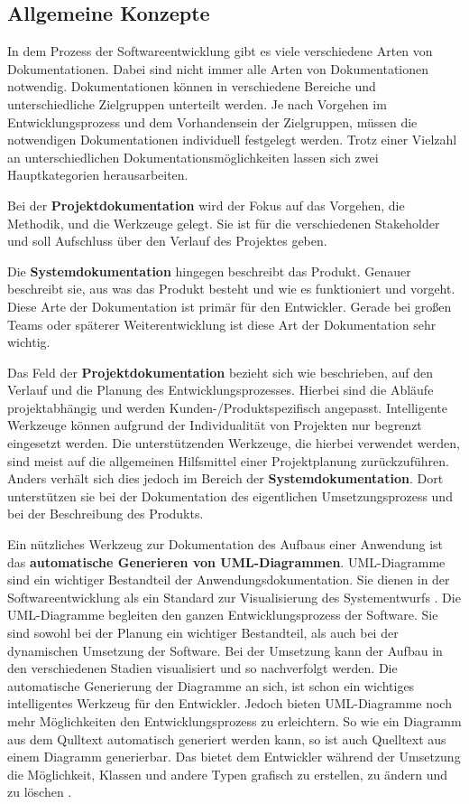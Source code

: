 \subsection{Allgemeine Konzepte}
\label{subsec:documentation_collaboration_concepts}
In dem Prozess der Softwareentwicklung gibt es viele verschiedene Arten von Dokumentationen. Dabei sind nicht immer alle Arten von Dokumentationen notwendig. Dokumentationen können in verschiedene Bereiche und unterschiedliche Zielgruppen unterteilt werden. Je nach Vorgehen im Entwicklungsprozess und dem Vorhandensein der Zielgruppen, müssen die notwendigen Dokumentationen individuell festgelegt werden. 
Trotz einer Vielzahl an unterschiedlichen Dokumentationsmöglichkeiten lassen sich zwei Hauptkategorien herausarbeiten. 

Bei der \textbf{Projektdokumentation} wird der Fokus auf das Vorgehen, die Methodik, und die Werkzeuge gelegt. Sie ist für die verschiedenen Stakeholder und soll Aufschluss über den Verlauf des Projektes geben. 

Die \textbf{Systemdokumentation} hingegen beschreibt das Produkt. Genauer beschreibt sie, aus was das Produkt besteht und wie es funktioniert und vorgeht. Diese Arte der Dokumentation ist primär für den Entwickler. Gerade bei großen Teams oder späterer Weiterentwicklung ist diese Art der Dokumentation sehr wichtig. 

Das Feld der \textbf{Projektdokumentation} bezieht sich wie beschrieben, auf den Verlauf und die Planung des Entwicklungsprozesses. Hierbei sind die Abläufe projektabhängig und werden Kunden-/Produktspezifisch angepasst. 
Intelligente Werkzeuge können aufgrund der Individualität von Projekten nur begrenzt eingesetzt werden. Die unterstützenden Werkzeuge, die hierbei verwendet werden, sind meist auf die allgemeinen Hilfsmittel einer Projektplanung zurückzuführen. 
Anders verhält sich dies jedoch im Bereich der \textbf{Systemdokumentation}. Dort unterstützen sie bei der Dokumentation des eigentlichen Umsetzungsprozess und bei der Beschreibung des Produkts.

Ein nützliches Werkzeug zur Dokumentation des Aufbaus einer Anwendung ist das \textbf{automatische Generieren von UML-Diagrammen}. UML-Diagramme sind ein wichtiger Bestandteil der Anwendungsdokumentation. Sie dienen in der Softwareentwicklung als ein Standard zur Visualisierung des Systementwurfs \cite{Ambler.2004}. Die UML-Diagramme begleiten den ganzen Entwicklungsprozess der Software. Sie sind sowohl bei der Planung ein wichtiger Bestandteil, als auch bei der dynamischen Umsetzung der Software. Bei der Umsetzung kann der Aufbau in den verschiedenen Stadien visualisiert und so nachverfolgt werden. Die automatische Generierung der Diagramme an sich, ist schon ein wichtiges intelligentes Werkzeug für den Entwickler. Jedoch bieten UML-Diagramme noch mehr Möglichkeiten den Entwicklungsprozess zu erleichtern. So wie ein Diagramm aus dem Qulltext automatisch generiert werden kann, so ist auch Quelltext aus einem Diagramm generierbar. Das bietet dem Entwickler während der Umsetzung die Möglichkeit, Klassen und andere Typen grafisch zu erstellen, zu ändern und zu löschen \cite{TerryG.Lee.2022}.

